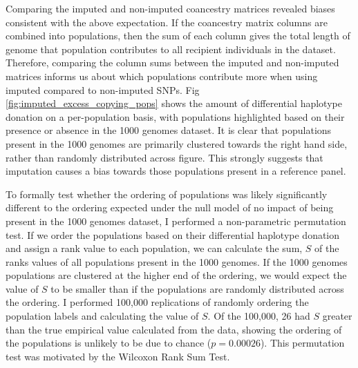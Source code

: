 Comparing the imputed and non-imputed coancestry matrices revealed biases consistent with the above expectation. If the coancestry matrix columns are combined into populations, then the sum of each column gives the total length of genome that population contributes to all recipient individuals in the dataset. Therefore, comparing the column sums between the imputed and non-imputed matrices informs us about which populations contribute more when using imputed compared to non-imputed SNPs. Fig \ref{fig:imputed_excess_copying_pops} shows the amount of differential haplotype donation on a per-population basis, with populations highlighted based on their presence or absence in the 1000 genomes dataset. It is clear that populations present in the 1000 genomes are primarily clustered towards the right hand side, rather than randomly distributed across figure. This strongly suggests that imputation causes a bias towards those populations present in a reference panel. 

To formally test whether the ordering of populations was likely significantly different to the ordering expected under the null model of no impact of being present in the 1000 genomes dataset, I performed a non-parametric permutation test. If we order the populations based on their differential haplotype donation and assign a rank value to each population, we can calculate the sum, $S$ of the ranks values of all populations present in the 1000 genomes. If the 1000 genomes populations are clustered at the higher end of the ordering, we would expect the value of $S$ to be smaller than if the populations are randomly distributed across the ordering. I performed 100,000 replications of randomly ordering the population labels and calculating the value of $S$. Of the 100,000, 26 had $S$ greater than the true empirical value calculated from the data, showing the ordering of the populations is unlikely to be due to chance ($p=0.00026$). This permutation test was motivated by the Wilcoxon Rank Sum Test.  

